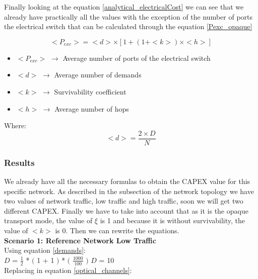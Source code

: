 Finally looking at the equation \ref{analytical_electricalCost} we can see that we already have practically all the values with the exception of the number of ports the electrical switch that can be calculated through the equation \ref{Pexc_opaque}

\begin{equation}
<P_{exc}> = <d> \times [1 + \left(1 + <k>\right) \times <h>]
\label{Pexc_opaque}
\end{equation}

\begin{itemize}
\item{$<P_{exc}>$ $\rightarrow$ Average number of ports of the electrical switch}
\item{$<d>$		  $\rightarrow$ Average number of demands}
\item{$<k>$		  $\rightarrow$ Survivability coefficient}	
\item{$<h>$	      $\rightarrow$ Average number of hops}
\end{itemize}

Where:
\begin{equation}
<d> = \frac{2 \times D}{N}
\label{average_demand}
\end{equation}

\subsubsection{Results}

We already have all the necessary formulas to obtain the CAPEX value for this specific network. As described in the subsection of the network topology we have two values of network traffic, low traffic and high traffic, soon we will get two different CAPEX. Finally we have to take into account that as it is the opaque transport mode, the value of $\xi$ is 1 and because it is without survivability, the value of $<k>$ is 0. Then we can rewrite the equations.\\

\textbf{Scenario 1: Reference Network Low Traffic}\\

Using equation \ref{demands}:\\

$D$ = $\frac{1}{2}$ * $($ 1 + 1 $)$ * $($ $\frac{1000}{100}$ $)$ \qquad \qquad $D$ = 10\\

Replacing in equation \ref{optical_channels}:\\


